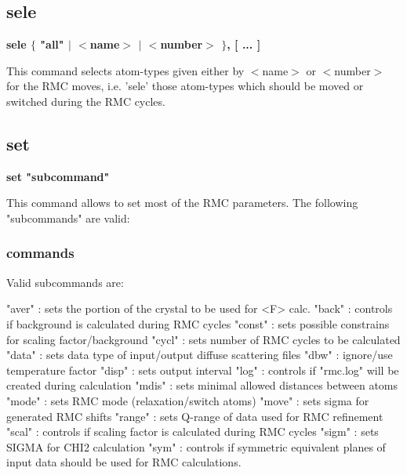 \subsection*{sele}
{\bf sele $ \{$ "all" $| $ $ <$name$> $ $| $ $ <$number$> $ $\} $, [ ... ] \par }
\par
\vspace{3pt}
This command selects atom-types given either by $ <$name$> $ or $ <$number$> $ 
for the RMC moves, i.e. 'sele' those atom-types which should be 
moved or switched during the RMC cycles. 
\subsection*{set}
{\bf set "subcommand" \par }
\par
\vspace{3pt}
This command allows to set most of the RMC parameters. The following 
"subcommands" are valid: 
\par
\subsubsection{commands}
Valid subcommands are: 
\par
\begin{MacVerbatim}
"aver"     : sets the portion of the crystal to be used for <F> calc.
"back"     : controls if background is calculated during RMC cycles
"const"    : sets possible constrains for scaling factor/background
"cycl"     : sets number of RMC cycles to be calculated
"data"     : sets data type of input/output diffuse scattering files
"dbw"      : ignore/use temperature factor
"disp"     : sets output interval
"log"      : controls if "rmc.log" will be created during calculation
"mdis"     : sets minimal allowed distances between atoms
"mode"     : sets RMC mode (relaxation/switch atoms)
"move"     : sets sigma for generated RMC shifts
"range"    : sets Q-range of data used for RMC refinement
"scal"     : controls if scaling factor is calculated during RMC cycles
"sigm"     : sets SIGMA for CHI2 calculation
"sym"      : controls if symmetric equivalent planes of input data should
             be used for RMC calculations.
\end{MacVerbatim}
